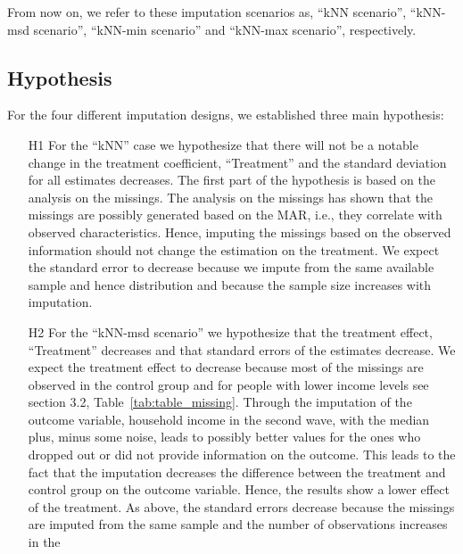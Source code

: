 From now on, we refer to these imputation scenarios as, ``kNN scenario'', ``kNN-msd scenario'', ``kNN-min scenario'' and ``kNN-max scenario'', respectively.

\subsection{Hypothesis}
For the four different imputation designs, we established three main hypothesis:

\begin{itemize}

	\item[H1] For the ``kNN'' case we hypothesize that there will not be a notable change in the treatment coefficient, ``Treatment'' and the standard deviation for all estimates decreases. The first part of the hypothesis is based on the analysis on the missings. The analysis on the missings has shown that the missings are possibly generated based on the \ac{MAR}, i.e., they correlate with observed characteristics. Hence, imputing the missings based on the observed information should not change the estimation on the treatment. We expect the standard error to decrease because we impute from the same available sample and hence distribution and because the sample size increases with imputation.

	\item[H2] For the ``kNN-msd scenario'' we hypothesize that the treatment effect, ``Treatment'' decreases and that standard errors of the estimates decrease. We expect the treatment effect to decrease because most of the missings are observed in the control group and for people with lower income levels see section 3.2, Table~\ref{tab:table_missing}. Through the imputation of the outcome variable, household income in the second wave, with the median plus, minus some noise, leads to possibly better values for the ones who dropped out or did not provide information on the outcome. This leads to the fact that the imputation decreases the difference between the treatment and control group on the outcome variable. Hence, the results show a lower effect of the treatment. As above, the standard errors decrease because the missings are imputed from the same sample and the number of observations increases in the


\end{itemize}
